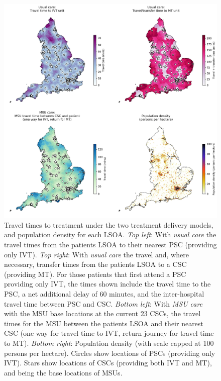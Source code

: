 \begin{figure}[h!]
    \centering
    \includegraphics[width=1.0\linewidth]{images/map_times.jpg}
    \caption{Travel times to treatment under the two treatment delivery models, and population density for each LSOA. \textit{Top left}: With \emph{usual care} the travel times from the patients LSOA to their nearest PSC (providing only IVT). \textit{Top right}: With \emph{usual care} the travel and, where necessary, transfer times from the patients LSOA to a CSC (providing MT). For those patients that first attend a PSC providing only IVT, the times shown include the travel time to the PSC, a net additional delay of 60 minutes, and the inter-hospital travel time between PSC and CSC. \textit{Bottom left}: With \emph{MSU care} with the MSU base locations at the current 23 CSCs, the travel times for the MSU between the patients LSOA and their nearest CSC (one way for travel time to IVT, return journey for travel time to MT). \textit{Bottom right}: Population density (with scale capped at 100 persons per hectare). Circles show locations of PSCs (providing only IVT). Stars show locations of CSCs (providing both IVT and MT), and being the base locations of MSUs.}
    \label{fig:map_times}
\end{figure}

